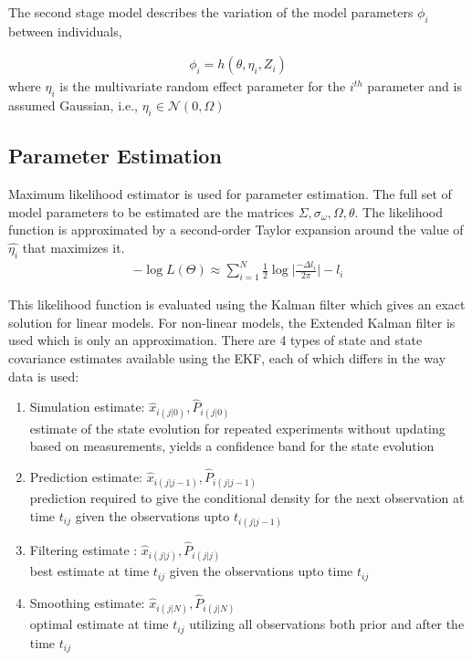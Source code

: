 \documentclass[a4paper,11pt]{article}\usepackage[]{graphicx}\usepackage[]{color}
\begin{document}
The second stage model describes the variation of the model parameters $\phi_i$ between individuals,

\begin{align*}
\phi_i = h(\theta, \eta_i, Z_i)
\end{align*}
where $\eta_i$ is the multivariate random effect parameter for the $i^{th}$ parameter and is assumed Gaussian, i.e., $\eta_i \in \mathcal{N}(0, \Omega)$

\subsection{Parameter Estimation}
Maximum likelihood estimator is used for parameter estimation. The full set of model parameters to be estimated are the matrices $\Sigma, \sigma_{\omega}, \Omega, \theta$. The likelihood function is approximated by a second-order Taylor expansion around the value of $\hat{\eta_i}$ that maximizes it.
\begin{align*}
- \log L(\Theta) \approx \sum_{i=1}^N \frac{1}{2} \log \Bigg|\frac{-\Delta l_i}{2 \pi}\Bigg| - l_i
\end{align*}

This likelihood function is evaluated using the Kalman filter which gives an exact solution for linear models. For non-linear models, the Extended Kalman filter is used which is only an approximation. There are 4 types of state and state covariance estimates available using the EKF, each of which differs in the way data is used:

\begin{enumerate}
\item Simulation estimate: $\hat{x}_{i(j|0)}, \hat{P}_{i(j|0)}$ \\
estimate of the state evolution for repeated experiments without updating based on measurements, yields a confidence band for the state evolution
\item Prediction estimate: $\hat{x}_{i(j|j-1)}, \hat{P}_{i(j|j-1)}$ \\
prediction required to give the conditional density for the next observation at time $t_{ij}$ given the observations upto $t_{i(j|j-1)}$
\item Filtering estimate : $\hat{x}_{i(j|j)}, \hat{P}_{i(j|j)}$ \\
best estimate at time $t_{ij}$ given the observations upto time $t_{ij}$ 
\item Smoothing estimate: $\hat{x}_{i(j|N)}, \hat{P}_{i(j|N)}$ \\
optimal estimate at time $t_{ij}$ utilizing all observations both prior and after the time $t_{ij}$
\end{enumerate}
\end{document}
